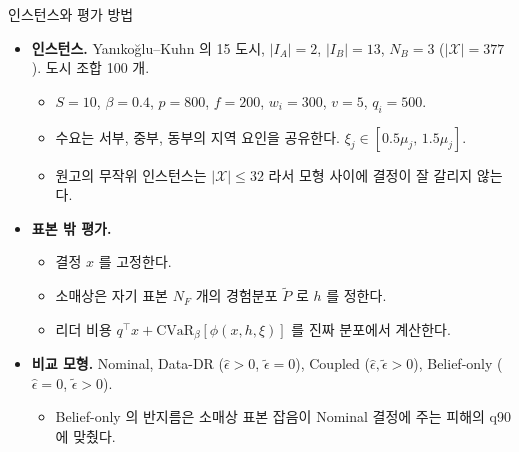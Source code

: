 \documentclass[aspectratio=169,11pt]{beamer}
\newcommand{\heps}{\hat{\epsilon}}
\newcommand{\teps}{\tilde{\epsilon}}
\newcommand{\CVaR}{\mathrm{CVaR}}
\begin{document}
\begin{frame}{인스턴스와 평가 방법}
\begin{itemize}
  \item \textbf{인스턴스.} Yan{\i}ko\u{g}lu--Kuhn 의 15 도시, $|I_A| = 2$, $|I_B| = 13$, $N_B = 3$ ($|\mathcal{X}| = 377$). 도시 조합 100 개.
  \begin{itemize}
    \item $S = 10$, $\beta = 0.4$, $p = 800$, $f = 200$, $w_i = 300$, $v = 5$, $q_i = 500$.
    \item 수요는 서부, 중부, 동부의 지역 요인을 공유한다. $\xi_j \in [0.5\mu_j,\,1.5\mu_j]$.
    \item 원고의 무작위 인스턴스는 $|\mathcal{X}| \le 32$ 라서 모형 사이에 결정이 잘 갈리지 않는다.
  \end{itemize}
  \item \textbf{표본 밖 평가.}
  \begin{itemize}
    \item 결정 $x$ 를 고정한다.
    \item 소매상은 자기 표본 $N_F$ 개의 경험분포 $\tilde P$ 로 $h$ 를 정한다.
    \item 리더 비용 $q^\top x + \CVaR_\beta[\phi(x,h,\xi)]$ 를 진짜 분포에서 계산한다.
  \end{itemize}
  \item \textbf{비교 모형.} Nominal, Data-DR ($\heps > 0$, $\teps = 0$), Coupled ($\heps,\teps > 0$), Belief-only ($\heps = 0$, $\teps > 0$).
  \begin{itemize}
    \item Belief-only 의 반지름은 소매상 표본 잡음이 Nominal 결정에 주는 피해의 q90 에 맞췄다.
  \end{itemize}
\end{itemize}
\end{frame}
\end{document}
